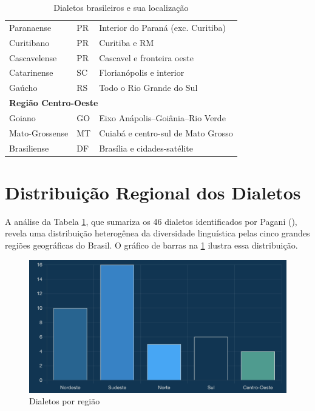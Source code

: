 \begin{table}[ht]
\begin{tabular}{lll}
Paranaense   & PR                    & Interior do Paraná (exc. Curitiba) \\
Curitibano   & PR                    & Curitiba e RM                      \\
Cascavelense & PR                    & Cascavel e fronteira oeste         \\
Catarinense  & SC                    & Florianópolis e interior           \\
Gaúcho       & RS                    & Todo o Rio Grande do Sul           \\
\hline
\multicolumn{3}{l}{\textbf{Região Centro-Oeste}} \\ \hline
Goiano         & GO & Eixo Anápolis–Goiânia–Rio Verde  \\
Mato-Grossense & MT & Cuiabá e centro-sul de Mato Grosso \\
Brasiliense    & DF & Brasília e cidades-satélite        \\
\hline
\end{tabular}
\caption{Dialetos brasileiros e sua localização}
\label{tab:dialetos_pagani}
\end{table}








\section{Distribuição Regional dos Dialetos}


A análise da Tabela \ref{tab:dialetos_pagani}, que sumariza os 46 dialetos identificados por Pagani (\citeyear{pagani2022}), revela uma distribuição heterogênea da diversidade linguística pelas cinco grandes regiões geográficas do Brasil. O gráfico de barras na  \ref{fig:dialetos-por-regiao} ilustra essa distribuição.


\begin{figure}
    \centering
    \includegraphics[width=0.75\linewidth]{images/grafico-dialetos-regiao.png}
    \caption{Dialetos por região}
    \label{fig:dialetos-por-regiao}
\end{figure}


